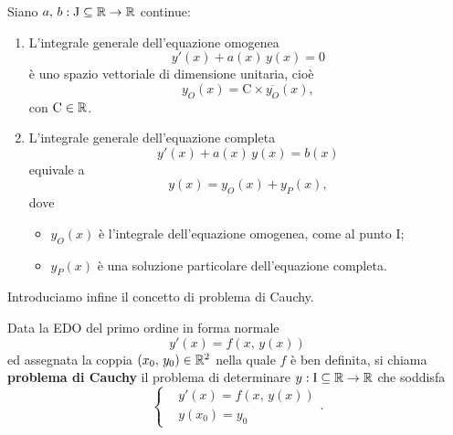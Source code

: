 \documentclass[../../analisi2]{subfiles}
\begin{document}
        \begin{teorema}
            Siano \(a, \, b : \mathrm{J} \subseteq \mathbb{R} \to \mathbb{R}\) continue:
            \begin{enumerate}
                \item L'integrale generale dell'equazione omogenea
                    \[
                        y'(x) + a(x) \, y(x) = 0
                    \]
                    è uno spazio vettoriale di dimensione unitaria, cioè
                    \[
                        y_O(x) = \mathrm{C} \times \overline{y_O}(x),
                    \]
                    con \(\mathrm{C} \in \mathbb{R}\).
                \item L'integrale generale dell'equazione completa
                    \[
                        y'(x) + a(x) \, y(x) = b(x)
                    \]
                    equivale a
                    \[
                        y(x) = y_O(x) + y_P(x),
                    \]
                    dove
                    \begin{itemize}
                        \item \(y_O(x)\) è l'integrale dell'equazione omogenea, come al punto I;
                        \item \(y_P(x)\) è una soluzione particolare dell'equazione completa.
                    \end{itemize}
            \end{enumerate}
        \end{teorema}

        Introduciamo infine il concetto di problema di Cauchy.

        \begin{definizione}
            Data la EDO del primo ordine in forma normale
            \[
                y'(x) = f\left(x, \, y(x)\right)
            \]
            ed assegnata la coppia \((x_0, \, y_0) \in \mathbb{R}^2\) nella quale \(f\) è ben definita, si chiama \textbf{problema di Cauchy}
            il problema di determinare \(y : \mathrm{I} \subseteq \mathbb{R} \to \mathbb{R}\) che soddisfa
            \[
                \left\{
                    \begin{aligned}
                        &y'(x) = f \left(x, \, y(x)\right)\\
                        &y(x_0) = y_0
                    \end{aligned}
                \right.
                .
            \]
        \end{definizione}
            
\end{document}
